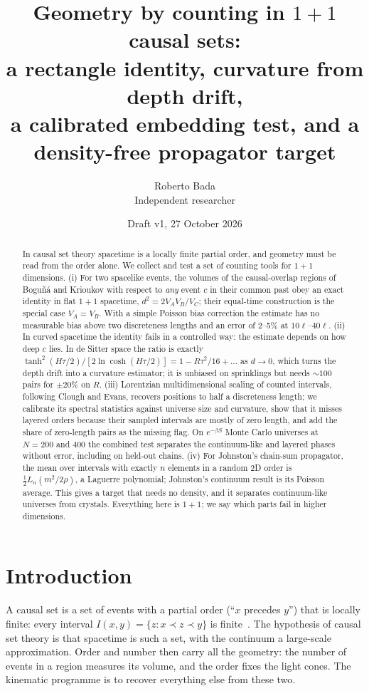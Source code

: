 \documentclass[11pt,a4paper]{article}
\title{Geometry by counting in $1+1$ causal sets:\\ a rectangle identity, curvature from depth drift,\\ a calibrated embedding test, and a density-free propagator target}
\author{Roberto Bada\\ \small Independent researcher}  %
\date{Draft v1, 27 October 2026}
\begin{document}
\maketitle

\begin{abstract}
In causal set theory spacetime is a locally finite partial order, and geometry must be read from the order alone. We collect and test a set of counting tools for $1+1$ dimensions. (i) For two spacelike events, the volumes of the causal-overlap regions of Bogu\~n\'a and Krioukov with respect to \emph{any} event $c$ in their common past obey an exact identity in flat $1+1$ spacetime, $d^2=2V_AV_B/V_C$; their equal-time construction is the special case $V_A=V_B$. With a simple Poisson bias correction the estimate has no measurable bias above two discreteness lengths and an error of 2--5\% at $10\ell$--$40\ell$. (ii) In curved spacetime the identity fails in a controlled way: the estimate depends on how deep $c$ lies. In de Sitter space the ratio is exactly $\tanh^2(H\tau/2)/[2\ln\cosh(H\tau/2)]=1-R\tau^2/16+\dots$ as $d\to0$, which turns the depth drift into a curvature estimator; it is unbiased on sprinklings but needs $\sim100$ pairs for $\pm20\%$ on $R$. (iii) Lorentzian multidimensional scaling of counted intervals, following Clough and Evans, recovers positions to half a discreteness length; we calibrate its spectral statistics against universe size and curvature, show that it misses layered orders because their sampled intervals are mostly of zero length, and add the share of zero-length pairs as the missing flag. On $e^{-\beta S}$ Monte Carlo universes at $N=200$ and $400$ the combined test separates the continuum-like and layered phases without error, including on held-out chains. (iv) For Johnston's chain-sum propagator, the mean over intervals with exactly $n$ elements in a random 2D order is $\tfrac12L_n(m^2/2\rho)$, a Laguerre polynomial; Johnston's continuum result is its Poisson average. This gives a target that needs no density, and it separates continuum-like universes from crystals. Everything here is $1+1$; we say which parts fail in higher dimensions.
\end{abstract}

\section{Introduction}
A causal set is a set of events with a partial order (``$x$ precedes $y$'') that is locally finite: every interval $I(x,y)=\{z:x\prec z\prec y\}$ is finite~\cite{BLMS87,Surya19}. The hypothesis of causal set theory is that spacetime is such a set, with the continuum a large-scale approximation. Order and number then carry all the geometry: the number of events in a region measures its volume, and the order fixes the light cones. The kinematic programme is to recover everything else from these two.
\end{document}
